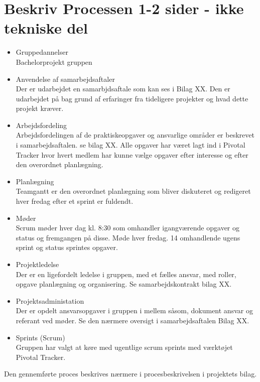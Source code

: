 \section{Beskriv Processen 1-2 sider - ikke tekniske del}
\begin{itemize}
\item Gruppedannelser\\
Bachelorprojekt gruppen 




\item Anvendelse af samarbejdsaftaler\\
Der er udarbejdet en samarbjdsaftale som kan ses i Bilag XX. Den er udarbejdet på bag grund af erfaringer fra tideligere projekter og hvad dette projekt kræver.
\item Arbejdsfordeling\\
Arbejdsfordelingen af de praktiskeopgaver og ansvarlige områder er beskrevet i samarbejdsaftalen. se bilag XX. Alle opgaver har været lagt ind i Pivotal Tracker hvor hvert medlem har kunne vælge opgaver efter interesse og efter den overordnet planlægning.
\item Planlægning\\
Teamgantt er den overordnet planlægning som bliver diskuteret og redigeret hver fredag efter et sprint er fuldendt.  
\item Møder\\
Scrum møder hver dag kl. 8:30 som omhandler igangværende opgaver og status og fremgangen på disse. Møde hver fredag. 14 omhandlende ugens sprint og status sprintes opgaver. 
\item Projektledelse\\
Der er en ligefordelt ledelse i gruppen, med et fælles ansvar, med roller, opgave planlægning og organisering. Se samarbejdskontrakt bilag XX.

\item Projektsadministation\\
Der er opdelt ansvarsopgaver i gruppen i mellem såsom, dokument ansvar og referant ved møder. Se den nærmere oversigt i samarbejdsaftalen Bilag XX.
\item Sprints (Scrum)\\
Gruppen har valgt at køre med ugentlige scrum sprints med værktøjet Pivotal Tracker. 
\end{itemize}
Den gennemførte proces beskrives nærmere i procesbeskrivelsen i projektets bilag.


